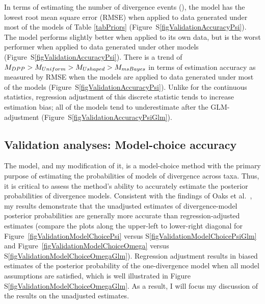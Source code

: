 In terms of estimating the number of divergence events (\divTimeNum), the
\modelDPP model has the lowest root mean square error (RMSE) when applied
to data generated under most of the models of Table \ref{tabPriors}
(Figure~S\ref{figValidationAccuracyPsi}).
The \modelOld model performs slightly better when applied to its own data,
but is the worst performer when applied to data generated under other models
(Figure~S\ref{figValidationAccuracyPsi}).
There is a trend of $M_{DPP} > M_{Uniform} > M_{Ushaped} > M_{msBayes}$
in terms of estimation accuracy as measured by RMSE when the models are applied
to data generated under most of the models
(Figure~S\ref{figValidationAccuracyPsi}).
Unlike for the continuous statistics, regression adjustment of this discrete
statistic tends to increase estimation bias; all of the models tend to
underestimate \divTimeNum after the GLM-adjustment
(Figure~S\ref{figValidationAccuracyPsiGlm}).

\subsection{Validation analyses: Model-choice accuracy}
The \msb model, and my modification of it, is a model-choice method
with the primary purpose of estimating the probabilities of models
of divergence across taxa.
Thus, it is critical to assess the method's ability to accurately
estimate the posterior probabilities of divergence models.
Consistent with the findings of Oaks et al.\ \cite{Oaks2012}, my results
demonstrate that the unadjusted estimates of divergence-model posterior
probabilities are generally more accurate than regression-adjusted estimates
(compare the plots along the upper-left to lower-right diagonal for
Figure~\ref{figValidationModelChoicePsi} versus
S\ref{figValidationModelChoicePsiGlm} and
Figure~\ref{figValidationModelChoiceOmega} versus
S\ref{figValidationModelChoiceOmegaGlm}).
Regression adjustment results in biased estimates of the posterior probability
of the one-divergence model when all model assumptions are satisfied, which is
well illustrated in Figure S\ref{figValidationModelChoiceOmegaGlm}.
As a result, I will focus my discussion of the results on the unadjusted
estimates.

